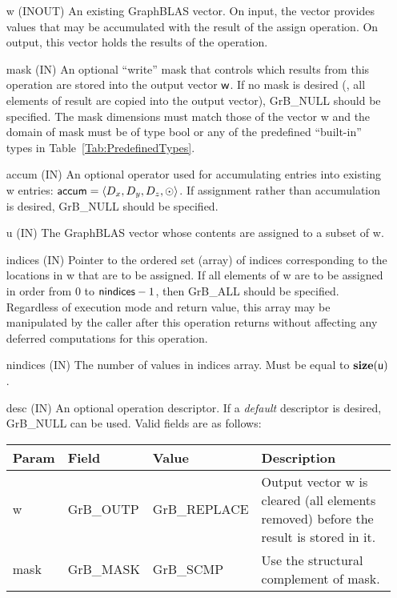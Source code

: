 \begin{itemize}[leftmargin=1in]
    \item[{\sf w}]    ({\sf INOUT}) An existing GraphBLAS vector.  On input,
    the vector provides values that may be accumulated with the result of the
    assign operation.  On output, this vector holds the results of the
    operation.

    \item[{\sf mask}]  ({\sf IN}) An optional ``write'' mask that controls which
    results from this operation are stored into the output vector
    ${\sf w}$.  If no mask is desired (\ie, all elements
    of result are copied into the output vector), {\sf GrB\_NULL}
    should be specified. The mask dimensions must match those of the
    vector {\sf w} and the domain of {\sf mask} must be
    of type {\sf bool} or any of the predefined ``built-in'' types in
    Table~\ref{Tab:PredefinedTypes}.

    \item[{\sf accum}]    ({\sf IN}) An optional operator used for accumulating
    entries into existing {\sf w} entries: ${\sf accum} = \langle D_x,
    D_y, D_z,\odot \rangle$. If assignment rather than accumulation is
    desired, {\sf GrB\_NULL} should be specified.

    \item[{\sf u}]        ({\sf IN}) The GraphBLAS vector whose contents are 
    assigned to a subset of {\sf w}.
    
    \item[{\sf indices}]  ({\sf IN}) Pointer to the ordered set (array) of 
    indices corresponding to the locations in {\sf w} that are to be assigned.  
    If all elements of {\sf w} are to be assigned in order from $0$ to 
    ${\sf nindices} - 1$, then {\sf GrB\_ALL} should be specified.  Regardless of 
    execution mode and return value, this array may be manipulated by the caller
    after this operation returns without affecting any deferred computations for 
    this operation.
    
    \item[{\sf nindices}] ({\sf IN}) The number of values in {\sf indices} array.
    Must be equal to $\bold{size}({\sf u})$.

    \item[{\sf desc}]     ({\sf IN}) An optional operation descriptor.  If a 
    \emph{default} descriptor is desired, {\sf GrB\_NULL} can be used.  Valid 
    fields are as follows: \\
    
    \begin{tabular}{lllp{2.5in}}
        Param & Field  & Value & Description \\
        \hline
        {\sf w}    & {\sf GrB\_OUTP} & {\sf GrB\_REPLACE} & Output vector {\sf w}
        is cleared (all elements removed) before the result is stored in it. \\
        
        {\sf mask} & {\sf GrB\_MASK} & {\sf GrB\_SCMP}   & Use the structural 
        complement of {\sf mask}. \\
    \end{tabular}
\end{itemize}

